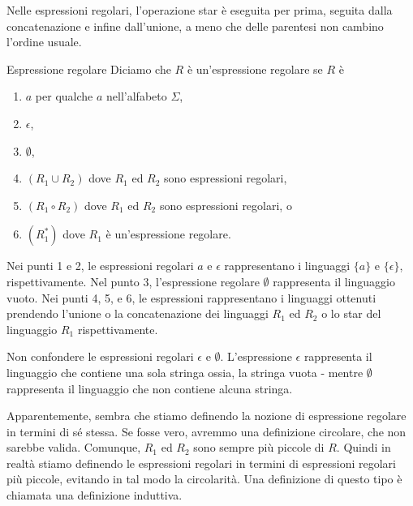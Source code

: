 Nelle espressioni regolari, l'operazione star è eseguita per prima, seguita dalla concatenazione e infine dall'unione, a meno che delle parentesi non cambino l'ordine usuale.

\begin{Definition}{Espressione regolare}{}
Diciamo che $R$ è un'espressione regolare se $R$ è
\begin{enumerate}
    \item $a$ per qualche $a$ nell'alfabeto $\Sigma$,
    \item $\epsilon$,
    \item $\emptyset$,
    \item $(R_{1}\cup R_2)$ dove $R_{1}$ ed $R_{2}$ sono espressioni regolari,
    \item $(R_{1}\circ R_2)$ dove $R_{1}$ ed $R_{2}$ sono espressioni regolari, o
    \item $(R_{1}^*)$ dove $R_{1}$ è un'espressione regolare.
\end{enumerate}

Nei punti 1 e 2, le espressioni regolari $a$ e $\epsilon$ rappresentano i linguaggi $\{a\}$ e $\{\epsilon\}$, rispettivamente. Nel punto 3, l'espressione regolare $\emptyset$ rappresenta il linguaggio vuoto. Nei punti 4, 5, e 6, le espressioni rappresentano i linguaggi ottenuti prendendo l'unione o la concatenazione dei linguaggi $R_{1}$ ed $R_{2}$ o lo star del linguaggio $R_{1}$ rispettivamente.
\end{Definition}

Non confondere le espressioni regolari $\epsilon$ e $\emptyset$. L'espressione $\epsilon$ rappresenta il linguaggio che contiene una sola stringa ossia, la stringa vuota - mentre $\emptyset$ rappresenta il linguaggio che non contiene alcuna stringa.

Apparentemente, sembra che stiamo definendo la nozione di espressione regolare in termini di sé stessa. Se fosse vero, avremmo una definizione circolare, che non sarebbe valida. Comunque, $R_{1}$ ed $R_{2}$ sono sempre più piccole di $R$. Quindi in realtà stiamo definendo le espressioni regolari in termini di espressioni regolari più piccole, evitando in tal modo la circolarità. Una definizione di questo tipo è chiamata una definizione induttiva.

